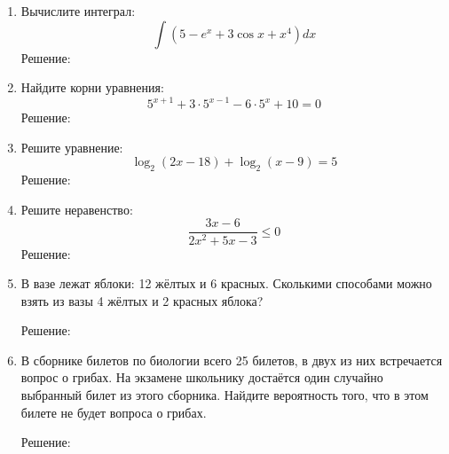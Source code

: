 \documentclass{article}
\begin{document}
\begin{enumerate}
\item %
Вычислите интеграл:
$$\int{\left(5-e^x+3\cos{x}+x^4\right)dx}$$
Решение:


\item %
Найдите корни уравнения:
$$5^{x+1}+3\cdot5^{x-1}-6\cdot5^x+10=0$$
Решение:


\item %
Решите уравнение:
$$\log_2{(2x-18)}+\log_2{(x-9)}=5$$
Решение:


\item %
Решите неравенство:
$$\frac{3x-6}{2x^2+5x-3}\leq0$$
Решение:


\item %
В вазе лежат яблоки: 12 жёлтых и 6 красных. Сколькими способами можно взять из вазы 4 жёлтых и 2 красных яблока?

Решение:



\item %
В сборнике билетов по биологии всего 25 билетов, в двух из них встречается вопрос о грибах. На экзамене школьнику достаётся один случайно выбранный билет из этого сборника. Найдите вероятность того, что в этом билете не будет вопроса о грибах.

Решение:

\end{enumerate}
\end{document}
